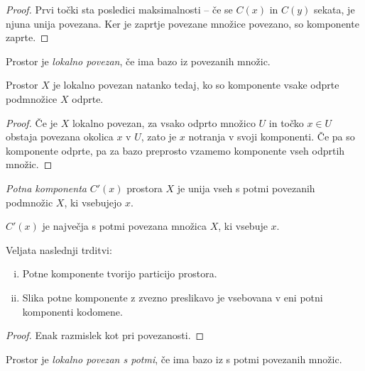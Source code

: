 \begin{proof}
Prvi točki sta posledici maksimalnosti -- če se $C(x)$ in $C(y)$
sekata, je njuna unija povezana. Ker je zaprtje povezane množice
povezano, so komponente zaprte.
\end{proof}


\begin{definicija}
Prostor je \emph{lokalno
povezan}, če ima bazo
iz povezanih množic.
\end{definicija}

\begin{trditev}
Prostor $X$ je lokalno povezan natanko tedaj, ko so komponente
vsake odprte podmnožice $X$ odprte.
\end{trditev}

\begin{proof}
Če je $X$ lokalno povezan, za vsako odprto množico $U$ in točko
$x \in U$ obstaja povezana okolica $x$ v $U$, zato je $x$ notranja
v svoji komponenti. Če pa so komponente odprte, pa za bazo
preprosto vzamemo komponente vseh odprtih množic.
\end{proof}

\begin{definicija}
\emph{Potna komponenta} $C'(x)$ prostora $X$ je unija vseh s potmi
povezanih podmnožic $X$, ki vsebujejo $x$.
\end{definicija}

\begin{opomba}
$C'(x)$ je največja s potmi povezana množica $X$, ki vsebuje $x$.
\end{opomba}

\begin{trditev}
Veljata naslednji trditvi:

\begin{enumerate}[i)]
\item Potne komponente tvorijo particijo prostora.
\item Slika potne komponente z zvezno preslikavo je vsebovana v
eni potni komponenti kodomene.
\end{enumerate}
\end{trditev}

\begin{proof}
Enak razmislek kot pri povezanosti.
\end{proof}

\begin{definicija}
Prostor je \emph{lokalno povezan s potmi}, če ima bazo iz s potmi
povezanih množic.
\end{definicija}


